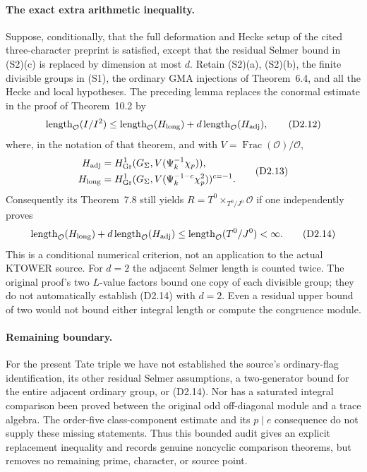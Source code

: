\paragraph{The exact extra arithmetic inequality.}
Suppose, conditionally, that the full deformation and Hecke
setup of the cited three-character preprint is satisfied,
except that the residual Selmer bound in (S2)(c) is replaced
by dimension at most $d$.  Retain (S2)(a), (S2)(b), the
finite divisible groups in (S1), the ordinary GMA injections
of Theorem~6.4, and all the Hecke and local hypotheses.
The preceding lemma replaces the conormal estimate in the
proof of Theorem~10.2 by
\[
 \operatorname{length}_{\mathcal O}(I/I^2)
 \leq\operatorname{length}_{\mathcal O}(H_{\rm long})
       +d\operatorname{length}_{\mathcal O}(H_{\rm adj}),       \tag{D2.12}
\]
where, in the notation of that theorem, and with
$V=\operatorname{Frac}(\mathcal O)/\mathcal O$,
\[
 \begin{aligned}
 H_{\rm adj}&=H^1_{\rm Gr}
   (G_\Sigma,V(\Psi_k^{-1}\chi_p)),\\
 H_{\rm long}&=H^1_{\rm Gr}
   (G_\Sigma,V(\Psi_k^{-1-c}\chi_p^2))^{c=-1}.
 \end{aligned}                                                \tag{D2.13}
\]
Consequently its Theorem~7.8 still yields $R=T^0\times_{T^0/J^0}
\mathcal O$ if one independently proves
\[
 \operatorname{length}_{\mathcal O}(H_{\rm long})
       +d\operatorname{length}_{\mathcal O}(H_{\rm adj})
 \leq\operatorname{length}_{\mathcal O}(T^0/J^0)<\infty.       \tag{D2.14}
\]
This is a conditional numerical criterion, not an application
to the actual KTOWER source.  For $d=2$ the adjacent Selmer
length is counted twice.  The original proof's two $L$-value
factors bound one copy of each divisible group; they do not
automatically establish (D2.14) with $d=2$.
Even a residual upper bound of two would not bound either
integral length or compute the congruence module.

\paragraph{Remaining boundary.}
For the present Tate triple we have not established the
source's ordinary-flag identification, its other residual
Selmer assumptions, a two-generator bound for the entire
adjacent ordinary group, or (D2.14).  Nor has a saturated
integral comparison been proved between the original odd
off-diagonal module and a trace algebra.  The order-five
class-component estimate and its $p\mid e$ consequence do
not supply these missing statements.  Thus this bounded
audit gives an explicit replacement inequality and records
genuine noncyclic comparison theorems, but removes no
remaining prime, character, or source point.

